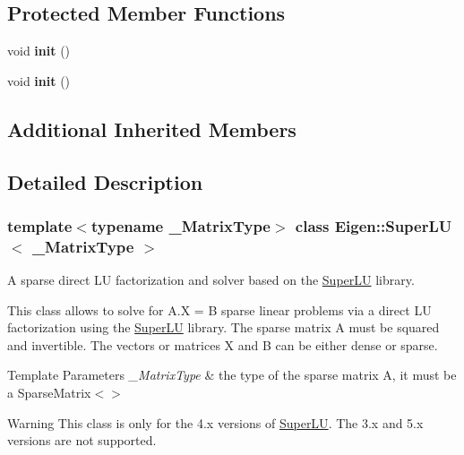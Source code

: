 \subsection*{Protected Member Functions}
\begin{DoxyCompactItemize}
\item 
\mbox{\label{class_eigen_1_1_super_l_u_afbdaacabc52182e6f31a1975469545ce}} 
void {\bfseries init} ()
\item 
\mbox{\label{class_eigen_1_1_super_l_u_afbdaacabc52182e6f31a1975469545ce}} 
void {\bfseries init} ()
\end{DoxyCompactItemize}
\subsection*{Additional Inherited Members}


\subsection{Detailed Description}
\subsubsection*{template$<$typename \+\_\+\+Matrix\+Type$>$\newline
class Eigen\+::\+Super\+L\+U$<$ \+\_\+\+Matrix\+Type $>$}

A sparse direct LU factorization and solver based on the \hyperlink{class_eigen_1_1_super_l_u}{Super\+LU} library. 

This class allows to solve for A.\+X = B sparse linear problems via a direct LU factorization using the \hyperlink{class_eigen_1_1_super_l_u}{Super\+LU} library. The sparse matrix A must be squared and invertible. The vectors or matrices X and B can be either dense or sparse.


\begin{DoxyTemplParams}{Template Parameters}
{\em \+\_\+\+Matrix\+Type} & the type of the sparse matrix A, it must be a Sparse\+Matrix$<$$>$\\
\hline
\end{DoxyTemplParams}
\begin{DoxyWarning}{Warning}
This class is only for the 4.\+x versions of \hyperlink{class_eigen_1_1_super_l_u}{Super\+LU}. The 3.\+x and 5.\+x versions are not supported.
\end{DoxyWarning}


